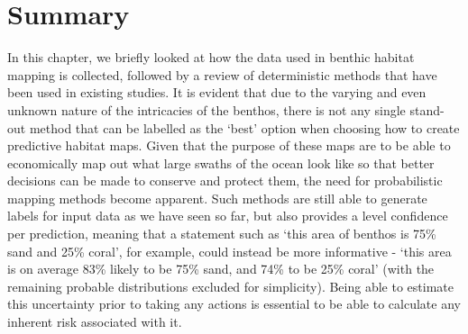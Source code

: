 \section{Summary}
In this chapter, we briefly looked at how the data used in benthic habitat mapping is collected, followed by a review of deterministic methods that have been used in existing studies. It is evident that due to the varying and even unknown nature of the intricacies of the benthos, there is not any single stand-out method that can be labelled as the `best' option when choosing how to create predictive habitat maps. Given that the purpose of these maps are to be able to economically map out what large swaths of the ocean look like so that better decisions can be made to conserve and protect them, the need for probabilistic mapping methods become apparent. Such methods are still able to generate labels for input data as we have seen so far, but also provides a level confidence per prediction, meaning that a statement such as `this area of benthos is 75\% sand and 25\% coral', for example, could instead be more informative - `this area is on average 83\% likely to be 75\% sand, and 74\% to be 25\% coral' (with the remaining probable distributions excluded for simplicity). Being able to estimate this uncertainty prior to taking any actions is essential to be able to calculate any inherent risk associated with it.

